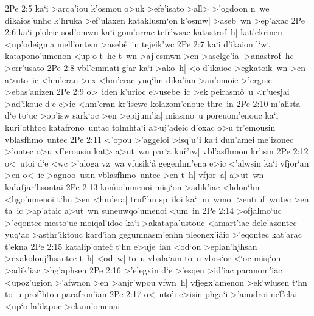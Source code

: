 \vs 2Pe 2:5
ka`i
>arqa'iou
k'osmou
o>uk
>efe'isato
>al\r{l}>
>'ogdoon
n~we
dikaios'unhc
k'hruka
>ef'ulaxen
kataklusm`on
k'osmw|
>aseb~wn
>ep'axac\bibvsend
\vs 2Pe 2:6
ka`i
p'oleic
sod'omwn
ka`i
gom'orrac
tefr'wsac
katastrof~h|
kat'ekrinen
<up'odeigma
mell'ontwn
>aseb\r{e}~in
tejeik'wc\bibvsend
\vs 2Pe 2:7
ka`i
d'ikaion
l`wt
katapono'umenon
<up`o
t~hc
t~wn
>aj'esmwn
>en
>aselge'ia|
>anastrof~hc
>err'usato\bibvsend
\vs 2Pe 2:8
vbl'emmati
g`ar
ka`i
>ako~h|
<o
d'ikaioc
>egkatoik~wn
>en
a>uto~ic
<hm'eran
>ex
<hm'erac
yuq`hn
dika'ian
>an'omoic
>'ergoic
>ebas'anizen\bibvsend
\vs 2Pe 2:9
o>~iden
k'urioc
e>usebe~ic
>ek
peirasm\r{o}~u
<r'uesjai
>ad'ikouc
d`e
e>ic
<hm'eran
kr'isewc
kolazom'enouc
thre~in\bibvsend
\vs 2Pe 2:10
m'alista
d`e
to`uc
>op'isw
sark`oc
>en
>epijum'ia|
miasmo~u
poreuom'enouc
ka`i
kuri'othtoc
katafrono~untac
tolmhta`i
a>uj'adeic
d'oxac
o>u
tr'emousin
vblasfhmo~untec\bibvsend
\vs 2Pe 2:11
<'opou
>'aggeloi
>isq'u"i
ka`i
dun'amei
me'izonec
>'ontec
o>u
vf'erousin
kat>
a>ut~wn
par`a
ku\r{r}'iw|
vbl'asfhmon
kr'isin\bibvsend
\vs 2Pe 2:12
o<~utoi
d`e
<wc
>'aloga
vz~wa
vfusik`a\r{}
gegenhm'ena
e>ic
<'alwsin
ka`i
vfjor`an
>en
o<~ic
>agnoo~usin
vblasfhmo~untec
>en
t~h|
vfjor~a|
a>ut~wn
ka\r{t}afjar'hsontai\bibvsend
{}
\vs 2Pe 2:13
ko\r{m}io'umenoi
misj`on
>adik'iac
<hdon`hn
<hgo'umenoi
t`hn
>en
<hm'era|
truf`hn
sp~iloi
ka`i
m~wmoi
>entruf~wntec
>en
ta~ic
>ap'ataic
a>ut~wn
suneuwqo'umenoi
<um~in\bibvsend
\vs 2Pe 2:14
>ofjalmo`uc
>'eqontec
mesto`uc
moiqal'idoc
ka`i
>akatapa'ustouc
<amart'iac
dele'azontec
yuq`ac
>asthr'iktouc
kard'ian
gegumnasm'enhn
pleonex'i\r{a}ic
>'eqontec
kat'arac
t'ekna\bibvsend
\vs 2Pe 2:15
katalip'ontec\r{}
t`hn
e>uje~ian
<od`on
>eplan'hjhsan
>exakolouj'hsantec
t~h|
<od~w|
to~u
vbala`am
to~u
vbos`or
<`oc
misj`on
>adik'iac
>hg'aphsen\bibvsend
\vs 2Pe 2:16
>'elegxin
d`e
>'esqen
>id'iac
paranom'iac
<upoz'ugion
>'afwnon
>en
>anjr'wpou
vfwn~h|
vfjegx'amenon
>ek'wlusen
t`hn
to~u
prof'htou
parafron'ian\bibvsend
\vs 2Pe 2:17
o<~uto'i
e>isin
phga`i
>'anudroi
ne\r{f}'elai
<up`o
la'ilapoc
>elaun'omenai
